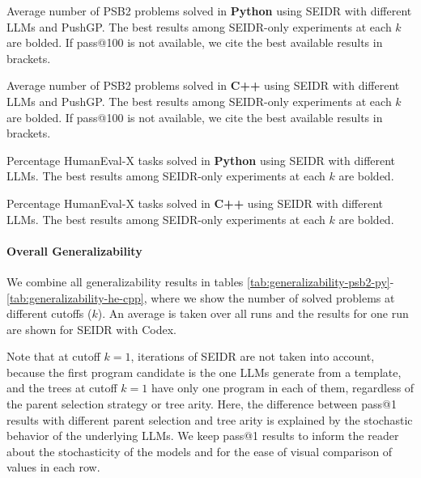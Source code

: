 \begin{table}
    \centering
    \caption{Average number of PSB2 problems solved in \textbf{Python} using SEIDR with different LLMs and PushGP. The best results among SEIDR-only experiments at each $k$ are bolded. If pass@100 is not available, we cite the best available results in brackets.}\small
    \label{tab:generalizability-psb2-py}

\end{table}

\begin{table}
  \centering
  \caption{Average number of PSB2 problems solved in \textbf{C++} using SEIDR with different LLMs and PushGP. The best results among SEIDR-only experiments at each $k$ are bolded. If pass@100 is not available, we cite the best available results in brackets.}\small
  \label{tab:generalizability-psb2-cpp}

\end{table}


\begin{table}
    \centering
    \caption{Percentage HumanEval-X tasks solved in \textbf{Python} using SEIDR with different LLMs. The best results among SEIDR-only experiments at each $k$ are bolded.}\small
    \label{tab:generalizability-he-py}

\end{table}

\begin{table}
  \centering
  \caption{Percentage HumanEval-X tasks solved in \textbf{C++} using SEIDR with different LLMs. The best results among SEIDR-only experiments at each $k$ are bolded.}\small
  \label{tab:generalizability-he-cpp}

\end{table}

\newpage
\paragraph{Overall Generalizability}

We combine all generalizability results in tables \ref{tab:generalizability-psb2-py}-\ref{tab:generalizability-he-cpp}, where we show the number of solved problems at different cutoffs ($k$). 
An average is taken over all runs and the results for one run are shown for SEIDR with Codex. 

Note that at cutoff $k=1$, iterations of SEIDR are not taken into account, because the first program candidate is the one LLMs generate from a template, and the trees at cutoff $k=1$ have only one program in each of them, regardless of the parent selection strategy or tree arity. 
Here, the difference between pass@1 results with different parent selection and tree arity is explained by the stochastic behavior of the underlying LLMs. 
We keep pass@1 results to inform the reader about the stochasticity of the models and for the ease of visual comparison of values in each row.

